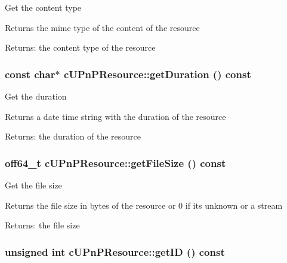 Get the content type

Returns the mime type of the content of the resource

\begin{Desc}
\item[Returns:]the content type of the resource \end{Desc}
\hypertarget{classcUPnPResource_5da7e39c5fc76f5607c232319daa135c}{
\subsubsection[{getDuration}]{\setlength{\rightskip}{0pt plus 5cm}const char$\ast$ cUPnPResource::getDuration () const}}
\label{classcUPnPResource_5da7e39c5fc76f5607c232319daa135c}


Get the duration

Returns a date time string with the duration of the resource

\begin{Desc}
\item[Returns:]the duration of the resource \end{Desc}
\hypertarget{classcUPnPResource_5cabb363c4fd0785d3f073011df835e9}{
\subsubsection[{getFileSize}]{\setlength{\rightskip}{0pt plus 5cm}off64\_\-t cUPnPResource::getFileSize () const}}
\label{classcUPnPResource_5cabb363c4fd0785d3f073011df835e9}


Get the file size

Returns the file size in bytes of the resource or 0 if its unknown or a stream

\begin{Desc}
\item[Returns:]the file size \end{Desc}
\hypertarget{classcUPnPResource_47ad15c119fbcfdda1bc5f60d0a3efc9}{
\subsubsection[{getID}]{\setlength{\rightskip}{0pt plus 5cm}unsigned int cUPnPResource::getID () const}}
\label{classcUPnPResource_47ad15c119fbcfdda1bc5f60d0a3efc9}


